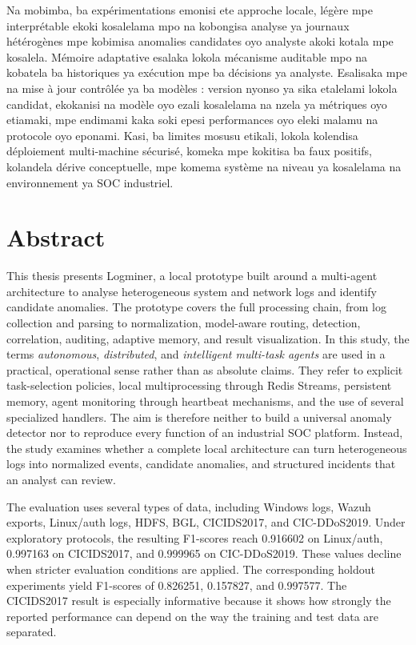 \documentclass[12pt,a4paper,oneside]{report}
\newcommand{\logminer}{Logminer}
\begin{document}
Na mobimba, ba expérimentations emonisi ete approche locale, légère mpe interprétable ekoki kosalelama mpo na kobongisa analyse ya journaux hétérogènes mpe kobimisa anomalies candidates oyo analyste akoki kotala mpe kosalela. Mémoire adaptative esalaka lokola mécanisme auditable mpo na kobatela ba historiques ya exécution mpe ba décisions ya analyste. Esalisaka mpe na mise à jour contrôlée ya ba modèles : version nyonso ya sika etalelami lokola candidat, ekokanisi na modèle oyo ezali kosalelama na nzela ya métriques oyo etiamaki, mpe endimami kaka soki epesi performances oyo eleki malamu na protocole oyo eponami. Kasi, ba limites mosusu etikali, lokola kolendisa déploiement multi-machine sécurisé, komeka mpe kokitisa ba faux positifs, kolandela dérive conceptuelle, mpe komema système na niveau ya kosalelama na environnement ya SOC industriel.

\chapter*{Abstract}

This thesis presents \logminer{}, a local prototype built around a multi-agent architecture to analyse heterogeneous system and network logs and identify candidate anomalies. The prototype covers the full processing chain, from log collection and parsing to normalization, model-aware routing, detection, correlation, auditing, adaptive memory, and result visualization. In this study, the terms \textit{autonomous}, \textit{distributed}, and \textit{intelligent multi-task agents} are used in a practical, operational sense rather than as absolute claims. They refer to explicit task-selection policies, local multiprocessing through Redis Streams, persistent memory, agent monitoring through heartbeat mechanisms, and the use of several specialized handlers. The aim is therefore neither to build a universal anomaly detector nor to reproduce every function of an industrial SOC platform. Instead, the study examines whether a complete local architecture can turn heterogeneous logs into normalized events, candidate anomalies, and structured incidents that an analyst can review.

The evaluation uses several types of data, including Windows logs, Wazuh exports, Linux/auth logs, HDFS, BGL, CICIDS2017, and CIC-DDoS2019. Under exploratory protocols, the resulting F1-scores reach 0.916602 on Linux/auth, 0.997163 on CICIDS2017, and 0.999965 on CIC-DDoS2019. These values decline when stricter evaluation conditions are applied. The corresponding holdout experiments yield F1-scores of 0.826251, 0.157827, and 0.997577. The CICIDS2017 result is especially informative because it shows how strongly the reported performance can depend on the way the training and test data are separated.
\end{document}

